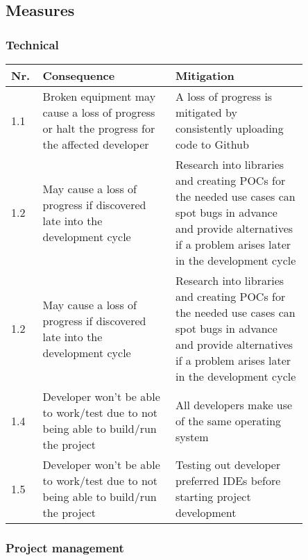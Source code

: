 \documentclass{article} %
\begin{document}
	\subsection{Measures}
	
	\subsubsection{Technical}
	
	\begin{center}
		\begin{tabular}{| p{0.05\linewidth} | p{0.4\linewidth} | p{0.4\linewidth} |}
			\hline
			Nr. & Consequence & Mitigation \\ [0.5ex] 
			\hline\hline
			1.1 & Broken equipment may cause a loss of progress or halt the progress for the affected developer &  A loss of progress is mitigated by consistently uploading code to Github \\
			\hline
			1.2 & May cause a loss of progress if discovered late into the development cycle & Research into libraries and creating POCs for the needed use cases can spot bugs in advance and provide alternatives if a problem arises later in the development cycle \\
			\hline
			1.2 & May cause a loss of progress if discovered late into the development cycle & Research into libraries and creating POCs for the needed use cases can spot bugs in advance and provide alternatives if a problem arises later in the development cycle \\
			\hline
			1.4 & Developer won't be able to work/test due to not being able to build/run the project & All developers make use of the same operating system \\
			\hline
			1.5 & Developer won't be able to work/test due to not being able to build/run the project  & Testing out developer preferred IDEs before starting project development \\ [1ex] 
			\hline
		\end{tabular}
	\end{center}
	
	\subsubsection{Project management}
\end{document}

